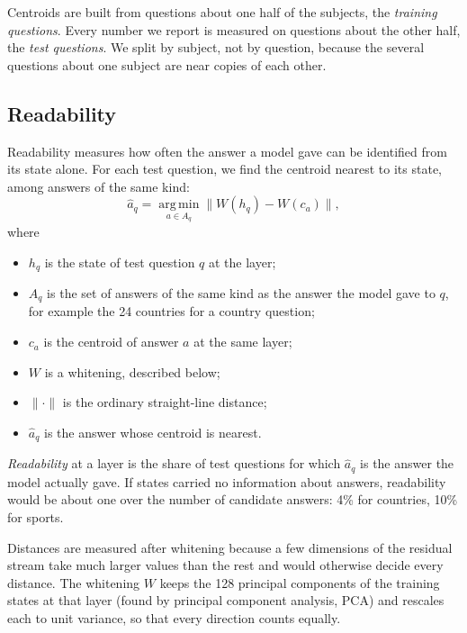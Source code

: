Centroids are built from questions about one half of the subjects, the \emph{training questions}. Every number we report is measured on questions about the other half, the \emph{test questions}. We split by subject, not by question, because the several questions about one subject are near copies of each other.

\subsection{Readability}
\label{sec:read}
Readability measures how often the answer a model gave can be identified from its state alone. For each test question, we find the centroid nearest to its state, among answers of the same kind:
\begin{equation}
\hat{a}_q = \operatorname*{arg\,min}_{a \in A_q} \big\lVert W(h_q) - W(c_a) \big\rVert,
\label{eq:read}
\end{equation}
where
\begin{itemize}\itemsep0pt
\item $h_q$ is the state of test question $q$ at the layer;
\item $A_q$ is the set of answers of the same kind as the answer the model gave to $q$, for example the 24 countries for a country question;
\item $c_a$ is the centroid of answer $a$ at the same layer;
\item $W$ is a whitening, described below;
\item $\lVert \cdot \rVert$ is the ordinary straight-line distance;
\item $\hat{a}_q$ is the answer whose centroid is nearest.
\end{itemize}
\emph{Readability} at a layer is the share of test questions for which $\hat{a}_q$ is the answer the model actually gave. If states carried no information about answers, readability would be about one over the number of candidate answers: 4\% for countries, 10\% for sports.

Distances are measured after whitening because a few dimensions of the residual stream take much larger values than the rest and would otherwise decide every distance. The whitening $W$ keeps the 128 principal components of the training states at that layer (found by principal component analysis, PCA) and rescales each to unit variance, so that every direction counts equally.
